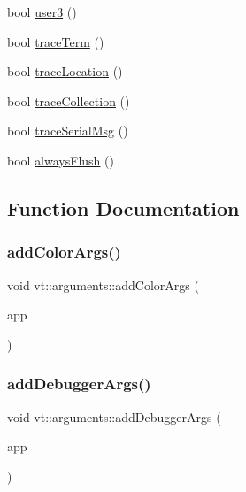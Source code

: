 \begin{DoxyCompactItemize}
$$\item 
bool \hyperlink{namespacevt_1_1arguments_afedf2c9949568b862ec5f8274ef6846b}{user3} ()
\item 
bool \hyperlink{namespacevt_1_1arguments_a60b229dc93c6fce2f24faa8237137a89}{trace\+Term} ()
\item 
bool \hyperlink{namespacevt_1_1arguments_aa49925bcb858fa5bb4779a8e5db3b368}{trace\+Location} ()
\item 
bool \hyperlink{namespacevt_1_1arguments_ae1a1115524b75b6cc64e19968ff16c09}{trace\+Collection} ()
\item 
bool \hyperlink{namespacevt_1_1arguments_ad239f3b085f99c963780dbcb0efd5668}{trace\+Serial\+Msg} ()
\item 
bool \hyperlink{namespacevt_1_1arguments_a6d542414122f93d1b7c6eaa04c3aadfb}{always\+Flush} ()
\end{DoxyCompactItemize}


\subsection{Function Documentation}
\mbox{\label{namespacevt_1_1arguments_ad20ec30a52a3746760ec7ce8eaaf9af4}} 
\subsubsection{\texorpdfstring{add\+Color\+Args()}{addColorArgs()}}
{\footnotesize\ttfamily void vt\+::arguments\+::add\+Color\+Args (\begin{DoxyParamCaption}\item[{C\+L\+I\+::\+App \&}]{app }\end{DoxyParamCaption})}

\mbox{\label{namespacevt_1_1arguments_a0ac7bcdb2013e7b486c1f6e052cd8731}} 
\subsubsection{\texorpdfstring{add\+Debugger\+Args()}{addDebuggerArgs()}}
{\footnotesize\ttfamily void vt\+::arguments\+::add\+Debugger\+Args (\begin{DoxyParamCaption}\item[{C\+L\+I\+::\+App \&}]{app }\end{DoxyParamCaption})}

